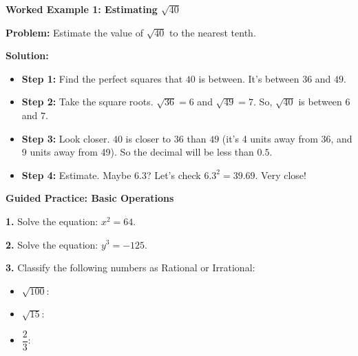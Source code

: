 \documentclass[12pt, letterpaper, fleqn]{article}
\newcommand{\blankshorter}{\underline{\hspace{1.5cm}}}
\begin{document}
\vspace{3mm}

\begin{tcolorbox}[colback=white, colframe=black!25, boxrule=0.6pt, arc=4mm, left=6mm, right=6mm, top=5mm, bottom=5mm]

\textbf{Worked Example 1: Estimating $\sqrt{40}$}

\medskip

\textbf{Problem:} Estimate the value of $\sqrt{40}$ to the nearest tenth.

\medskip

\textbf{Solution:}
\begin{itemize}
    \item \textbf{Step 1:} Find the perfect squares that $40$ is between. It's between $36$ and $49$.
    \item \textbf{Step 2:} Take the square roots. $\sqrt{36} = 6$ and $\sqrt{49} = 7$. So, $\sqrt{40}$ is between $6$ and $7$.
    \item \textbf{Step 3:} Look closer. $40$ is closer to $36$ than $49$ (it's 4 units away from 36, and 9 units away from 49). So the decimal will be less than $0.5$.
    \item \textbf{Step 4:} Estimate. Maybe $6.3$? Let's check $6.3^2 = 39.69$. Very close!
\end{itemize}

\end{tcolorbox}

\vspace{4mm}

\begin{tcolorbox}[colback=white!15, colframe=black, boxrule=1.5pt, arc=4mm, left=6mm, right=6mm, top=5mm, bottom=5mm]

\textbf{Guided Practice: Basic Operations}

\medskip

\noindent
\textbf{1.} Solve the equation: $x^2 = 64$.
\vspace{1.5cm}

\noindent
\textbf{2.} Solve the equation: $y^3 = -125$.
\vspace{1.5cm}

\noindent
\textbf{3.} Classify the following numbers as Rational or Irrational:
\begin{itemize}
    \item $\sqrt{100}$: \blankshorter
    \item $\sqrt{15}$: \blankshorter
    \item $\dfrac{2}{3}$: \blankshorter
\end{itemize}

\end{tcolorbox}
\end{document}
